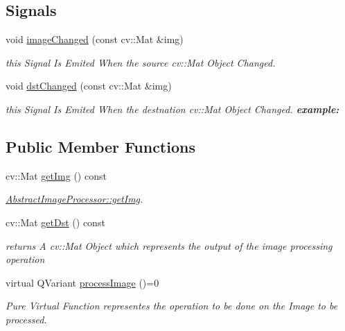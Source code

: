 \subsection*{Signals}
\begin{DoxyCompactItemize}
\item 
\mbox{\label{class_image_processor_1_1_abstract_image_processor_a4bd02b01c61941e2b0e69be7d890a22a}} 
void \hyperlink{class_image_processor_1_1_abstract_image_processor_a4bd02b01c61941e2b0e69be7d890a22a}{image\+Changed} (const cv\+::\+Mat \&img)
\begin{DoxyCompactList}\small\item\em this Signal Is Emited When the source cv\+::\+Mat Object Changed. \end{DoxyCompactList}\item 
void \hyperlink{class_image_processor_1_1_abstract_image_processor_ab42f4411848b924971026c104b9a5342}{dst\+Changed} (const cv\+::\+Mat \&img)
\begin{DoxyCompactList}\small\item\em this Signal Is Emited When the destnation cv\+::\+Mat Object Changed. {\bfseries example\+:} \end{DoxyCompactList}\end{DoxyCompactItemize}
\subsection*{Public Member Functions}
\begin{DoxyCompactItemize}
\item 
cv\+::\+Mat \hyperlink{class_image_processor_1_1_abstract_image_processor_a904d1619b2c6be2c5382469325ca43e3}{get\+Img} () const
\begin{DoxyCompactList}\small\item\em \hyperlink{class_image_processor_1_1_abstract_image_processor_a904d1619b2c6be2c5382469325ca43e3}{Abstract\+Image\+Processor\+::get\+Img}. \end{DoxyCompactList}\item 
cv\+::\+Mat \hyperlink{class_image_processor_1_1_abstract_image_processor_acbf98498ebece7b9f339222097a3429a}{get\+Dst} () const
\begin{DoxyCompactList}\small\item\em returns A cv\+::\+Mat Object which represents the output of the image processing operation \end{DoxyCompactList}\item 
virtual Q\+Variant \hyperlink{class_image_processor_1_1_abstract_image_processor_ad033ae911918b0f6842b7b1d6cdd2b90}{process\+Image} ()=0
\begin{DoxyCompactList}\small\item\em Pure Virtual Function representes the operation to be done on the Image to be processed. \end{DoxyCompactList}\end{DoxyCompactItemize}
